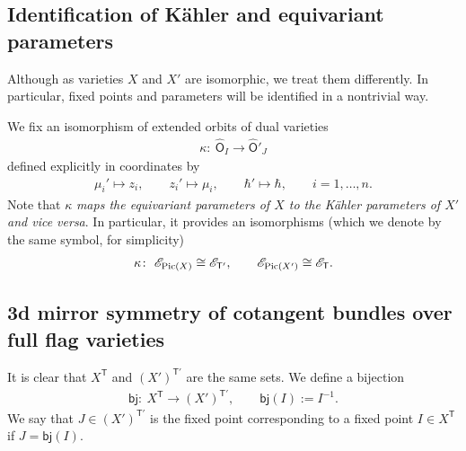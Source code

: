 \documentclass[pdftex]{sigma}
\newcommand{\bT}{\mathsf{T}}
\newcommand{\Or}{\textsf{O}}
\newcommand{\cE}{\mathscr{E}}
\numberwithin{equation}{section}
\begin{document}
 \subsection{Identification of K\"ahler and equivariant parameters}

 Although as varieties $X$ and $X'$ are isomorphic, we treat them differently. In particular, fixed points and parameters will be identified in a nontrivial way.

 We fix an isomorphism of extended orbits of dual varieties
 \begin{gather*}
 \kappa \colon \ \widehat{\Or}_{I} \rightarrow \widehat{\Or}'_{J}
 \end{gather*}
 defined explicitly in coordinates by
 \begin{gather*}
 \mu_{i}' \mapsto z_{i}, \qquad z_{i}' \mapsto \mu_{i}, \qquad \hbar' \mapsto \hbar , \qquad i=1,\dots, n.
 \end{gather*}
 Note that $\kappa$ {\it maps the equivariant parameters of $X$ to the K\"ahler parameters of $X'$ and vice versa}. In particular, it provides an isomorphisms (which we denote by the same symbol, for simplicity)
 \begin{gather} \label{ident}
 \kappa\colon \ \cE_{{\rm Pic}(X)}\cong \cE_{\bT'}, \qquad \cE_{{\rm Pic}(X')}\cong \cE_{\bT}.
 \end{gather}

\subsection{3d mirror symmetry of cotangent bundles over full flag varieties}
 It is clear that $X^{\bT}$ and $(X')^{\bT'}$ are the same sets. We define a bijection
 \begin{gather*}
 \textsf{bj}\colon \ X^{\bT} \rightarrow (X')^{\bT'}, \qquad \textsf{bj}(I) := I^{-1}.
 \end{gather*}
 We say that $J \in (X')^{\bT'}$ is the fixed point corresponding to a fixed point $I\in X^{\bT}$ if $J=\textsf{bj}(I)$.
\end{document}
